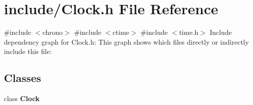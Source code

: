 \section{include/\+Clock.h File Reference}
\label{_clock_8h}
{\ttfamily \#include $<$chrono$>$}\newline
{\ttfamily \#include $<$ctime$>$}\newline
{\ttfamily \#include $<$time.\+h$>$}\newline
Include dependency graph for Clock.\+h\+:
This graph shows which files directly or indirectly include this file\+:
\subsection*{Classes}
\begin{DoxyCompactItemize}
\item 
class \textbf{ Clock}
\end{DoxyCompactItemize}
